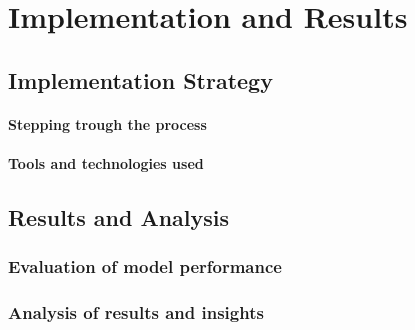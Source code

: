 \chapter{Implementation and Results}

\section{Implementation Strategy}
\subsubsection{Stepping trough the process}
\subsubsection{Tools and technologies used}

\section{Results and Analysis}
\subsection{Evaluation of model performance}
\subsection{Analysis of results and insights}